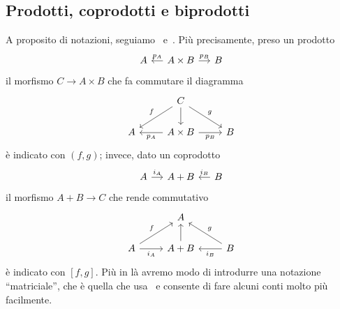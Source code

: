 \subsection{Prodotti, coprodotti e biprodotti}

\begin{notation}
  A proposito di notazioni, seguiamo~\cite{leinster:categories}
  e~\cite{riehl:categories}. Più precisamente, preso un prodotto
  \[
    \begin{tikzcd}[column sep=small]
      A & A \times B \ar["{p_A}", l, swap] \ar["{p_B}", r] & B
    \end{tikzcd}
  \]
  il morfismo \(C \to A \times B\) che fa commutare il diagramma
  \[
    \begin{tikzcd}
      & C \ar["{f}", dl, swap] \ar[d] \ar["{g}", dr] \\
      A & A \times B \ar["{p_A}", l] \ar["{p_B}", r, swap] & B
    \end{tikzcd}
  \]
  è indicato con \((f, g)\); invece, dato un coprodotto
  \[
    \begin{tikzcd}[column sep=small]
      A \ar["{i_A}", r] & A + B & B \ar["{i_B}", l, swap]
    \end{tikzcd}
  \]
  il morfismo \(A+B \to C\) che rende commutativo
  \[
    \begin{tikzcd}
      & A \\
      A \ar["{i_A}", r, swap] \ar["{f}", ur] & A + B \ar[u] & B
      \ar["{i_B}", l] \ar["{g}", ul, swap]
    \end{tikzcd}
  \]
  è indicato con \([f, g]\). Più in là avremo modo di introdurre una
  notazione ``matriciale'', che è quella che
  usa~\cite{buehler:exactcategories} e consente di fare alcuni conti
  molto più facilmente.
\end{notation}

